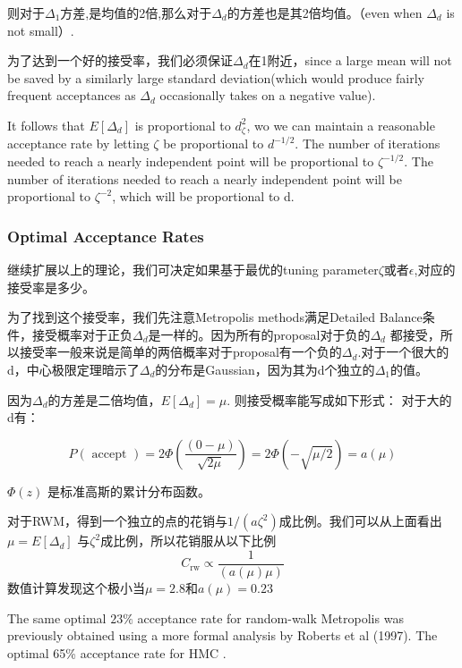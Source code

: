\documentclass[
]{book}
\theoremstyle{definition}
\theoremstyle{definition}
\theoremstyle{definition}
\theoremstyle{remark}
\begin{document}
则对于\(\Delta_1\)方差,是均值的2倍,那么对于\(\Delta_d\)的方差也是其2倍均值。（even when \(\Delta_d\) is not small）.

为了达到一个好的接受率，我们必须保证\(\Delta_d\)在1附近，since a large mean will not be saved by a similarly large standard deviation(which would produce fairly frequent acceptances as \(\Delta_d\) occasionally takes on a negative value).

It follows that \(E[\Delta_d]\) is proportional to \(d^2_\zeta\), wo we can maintain a reasonable acceptance rate by letting \(\zeta\) be proportional to \(d^{-1/2}\). The number of iterations needed to reach a nearly independent point will be proportional to \(\zeta^{-1/2}\). The number of iterations needed to reach a nearly independent point will be proportional to \(\zeta^{-2}\), which will be proportional to d.

\hypertarget{optimal-acceptance-rates}{%
\subsubsection{Optimal Acceptance Rates}\label{optimal-acceptance-rates}}

继续扩展以上的理论，我们可决定如果基于最优的tuning parameter\(\zeta\)或者\(\epsilon\),对应的接受率是多少。

为了找到这个接受率，我们先注意Metropolis methods满足Detailed Balance条件，接受概率对于正负\(\Delta_d\)是一样的。因为所有的proposal对于负的\(\Delta_d\) 都接受，所以接受率一般来说是简单的两倍概率对于proposal有一个负的\(\Delta_d\).对于一个很大的d，中心极限定理暗示了\(\Delta_d\)的分布是Gaussian，因为其为d个独立的\(\Delta_1\)的值。

因为\(\Delta_d\)的方差是二倍均值，\(E[\Delta_d]=\mu\). 则接受概率能写成如下形式：
对于大的d有：

\[
P(\text { accept })=2 \Phi\left(\frac{(0-\mu)}{\sqrt{2 \mu}}\right)=2 \Phi(-\sqrt{\mu / 2})=a(\mu)
\]

\(\Phi(z)\) 是标准高斯的累计分布函数。

对于RWM，得到一个独立的点的花销与\(1/(a\zeta^2)\)成比例。我们可以从上面看出\(\mu=E[\Delta_d]\) 与\(\zeta^2\)成比例，所以花销服从以下比例
\[
C_{\mathrm{rw}} \propto \frac{1}{(a(\mu) \mu)}
\]
数值计算发现这个极小当\(\mu=2.8\)和\(a(\mu)=0.23\)

The same optimal \(23\%\) acceptance rate for random-walk Metropolis was previously obtained using a more formal analysis by Roberts et al (1997). The optimal 65\% acceptance rate for HMC .
\end{document}
